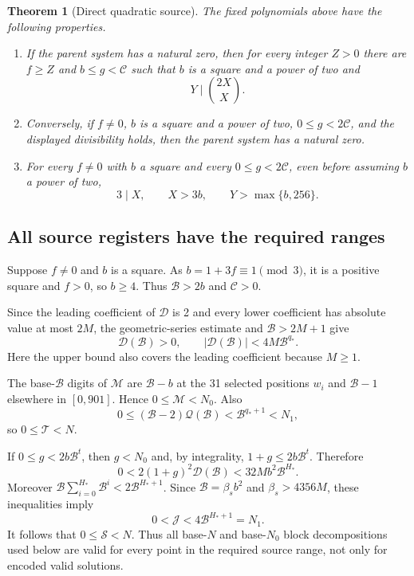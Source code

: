 \documentclass[11pt,letterpaper]{article}
\newtheorem{theorem}{Theorem}[section]
\theoremstyle{definition}\newtheorem{definition}[theorem]{Definition}
\theoremstyle{remark}\newtheorem{remark}[theorem]{Remark}
\newcommand{\cB}{\mathcal B}
\newcommand{\cC}{\mathcal C}
\newcommand{\cD}{\mathcal D}
\newcommand{\cJ}{\mathcal J}
\newcommand{\cM}{\mathcal M}
\newcommand{\cQ}{\mathcal Q}
\newcommand{\cS}{\mathcal S}
\newcommand{\cT}{\mathcal T}
\begin{document}
\begin{theorem}[Direct quadratic source]\label{thm:source}
The fixed polynomials above have the following properties.
\begin{enumerate}[label=(\roman*),leftmargin=2em]
\item If the parent system has a natural zero, then for every integer $Z>0$ there are $f\ge Z$ and $b\le g<\cC$ such that $b$ is a square and a power of two and
\[
 Y\mid\binom{2X}{X}.
\]
\item Conversely, if $f\ne0$, $b$ is a square and a power of two, $0\le g<2\cC$, and the displayed divisibility holds, then the parent system has a natural zero.
\item For every $f\ne0$ with $b$ a square and every $0\le g<2\cC$, even before assuming $b$ a power of two,
\[
 3\mid X,\qquad X>3b,\qquad Y>\max\{b,256\}.
\]
\end{enumerate}
\end{theorem}

\subsection{All source registers have the required ranges}

Suppose $f\ne0$ and $b$ is a square. As $b=1+3f\equiv1\pmod3$, it is a positive square and $f>0$, so $b\ge4$. Thus $\cB>2b$ and $\cC>0$.

Since the leading coefficient of $\cD$ is 2 and every lower coefficient has absolute value at most $2M$, the geometric-series estimate and $\cB>2M+1$ give
\begin{equation}\label{eq:Dpositive}
 \cD(\cB)>0,\qquad
 |\cD(\cB)|<4M\cB^{q_*}.
\end{equation}
Here the upper bound also covers the leading coefficient because $M\ge1$.

The base-$\cB$ digits of $\cM$ are $\cB-b$ at the 31 selected positions $w_i$ and $\cB-1$ elsewhere in $[0,901]$. Hence $0\le\cM<N_0$. Also
\[
 0\le(\cB-2)\cQ(\cB)<\cB^{q_*+1}<N_1,
\]
so $0\le\cT<N$.

If $0\le g<2b\cB^t$, then $g<N_0$ and, by integrality, $1+g\le2b\cB^t$. Therefore
\[
 0<2(1+g)^2\cD(\cB)<32Mb^2\cB^{H_*}.
\]
Moreover $\cB\sum_{i=0}^{H_*}\cB^i<2\cB^{H_*+1}$. Since $\cB=\beta_s b^2$ and $\beta_s>4356M$, these inequalities imply
\[
 0<\cJ<4\cB^{H_*+1}=N_1.
\]
It follows that $0\le\cS<N$. Thus all base-$N$ and base-$N_0$ block decompositions used below are valid for every point in the required source range, not only for encoded valid solutions.
\end{document}
